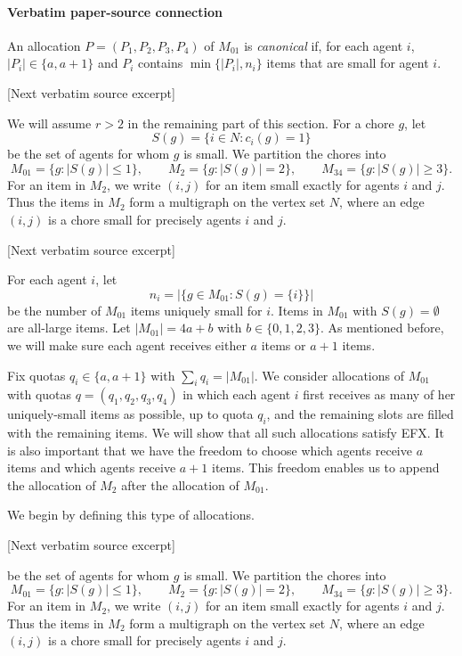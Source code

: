 \documentclass[10pt]{article}
\begin{document}
\paragraph{Verbatim paper-source connection}
\begin{ReviewVerbatim}
An allocation $P=(P_1,P_2,P_3,P_4)$ of $M_{01}$ is \emph{canonical} if, for each agent $i$, $|P_i|\in\{a,a+1\}$ and $P_i$ contains $\min\{|P_i|, n_i\}$ items that are small for agent $i$.

[Next verbatim source excerpt]

We will assume $r>2$ in the remaining part of this section.
For a chore $g$, let
\[
 S(g)=\{i\in N:c_i(g)=1\}
\]
be the set of agents for whom $g$ is small.  We partition the chores into
\[
M_{01}=\{g:|S(g)|\le 1\},\qquad
M_2=\{g:|S(g)|=2\},\qquad
M_{34}=\{g:|S(g)|\ge 3\}.
\]
For an item in $M_2$, we write $(i,j)$ for an item small exactly for agents
$i$ and $j$.  Thus the items in $M_2$ form a multigraph on the vertex set
$N$, where an edge $(i,j)$ is a chore small for precisely agents $i$ and $j$.

[Next verbatim source excerpt]

For each agent $i$, let
\[
 n_i=\left|\{g\in M_{01}:S(g)=\{i\}\}\right|
\]
be the number of $M_{01}$ items uniquely small for $i$.  Items in $M_{01}$
with $S(g)=\emptyset$ are all-large items.
Let $|M_{01}|=4a+b$ with $b\in\{0,1,2,3\}$.
As mentioned before, we will make sure each agent receives either $a$ items or $a+1$ items.

Fix quotas $q_i\in\{a,a+1\}$ with $\sum_i q_i=|M_{01}|$.
We consider allocations of $M_{01}$ with quotas $q=(q_1,q_2,q_3,q_4)$ in which each agent $i$ first receives as many of her uniquely-small items as possible, up to quota $q_i$, and the remaining slots are filled with the remaining items.
We will show that all such allocations satisfy EFX.
It is also important that we have the freedom to choose which agents receive $a$ items and which agents receive $a+1$ items.
This freedom enables us to append the allocation of $M_2$ after the allocation of $M_{01}$.

We begin by defining this type of allocations.


[Next verbatim source excerpt]

be the set of agents for whom $g$ is small.  We partition the chores into
\[
M_{01}=\{g:|S(g)|\le 1\},\qquad
M_2=\{g:|S(g)|=2\},\qquad
M_{34}=\{g:|S(g)|\ge 3\}.
\]
For an item in $M_2$, we write $(i,j)$ for an item small exactly for agents
$i$ and $j$.  Thus the items in $M_2$ form a multigraph on the vertex set
$N$, where an edge $(i,j)$ is a chore small for precisely agents $i$ and $j$.
\end{ReviewVerbatim}
\end{document}
